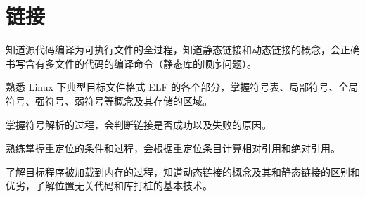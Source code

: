 \chapter{链接}
    \begin{summary}
        \begin{compactitem}
            \item 知道源代码编译为可执行文件的全过程，知道静态链接和动态链接的概念，会正确书写含有多文件的代码的编译命令（静态库的顺序问题）。
            \item 熟悉 Linux 下典型目标文件格式 ELF 的各个部分，掌握符号表、局部符号、全局符号、强符号、弱符号等概念及其存储的区域。
            \item 掌握符号解析的过程，会判断链接是否成功以及失败的原因。
            \item 熟练掌握重定位的条件和过程，会根据重定位条目计算相对引用和绝对引用。
            \item 了解目标程序被加载到内存的过程，知道动态链接的概念及其和静态链接的区别和优劣，了解位置无关代码和库打桩的基本技术。
        \end{compactitem}
    \end{summary}

